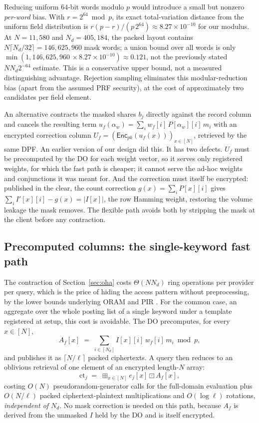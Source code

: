 \documentclass[a4paper,fleqn]{cas-sc}
\newif\ifauthorchecks
\newcommand{\authorcheck}[1]{\ifauthorchecks{\color{red}\textsf{[Authors: #1]}}\fi}
\newcommand{\Enc}{\mathsf{Enc}}
\newcommand{\bplus}{\boxplus}
\newcommand{\bdot}{\boxdot}
\begin{document}
Reducing uniform $64$-bit words modulo $p$ would introduce a
small but nonzero \emph{per-word} bias. With
$r=2^{64}\bmod p$, its exact total-variation distance from the uniform
field distribution is $r(p-r)/(p\,2^{64})\approx8.27\times10^{-10}$
for our modulus. At $N=11{,}580$ and $N_d=405{,}184$, the packed layout
contains $N\lceil N_d/32\rceil=146{,}625{,}960$ mask words;
a union bound over all words is only $\min(1,146{,}625{,}960\,
\times8.27\times10^{-10})\approx0.121$, not the previously stated
$N N_d 2^{-64}$ estimate. This is a conservative upper bound,
not a measured distinguishing advantage. Rejection sampling eliminates
this modular-reduction bias (apart from the assumed PRF security),
at the cost of approximately two candidates per field element. \authorcheck{The C++ prototype still reduces 64-bit
words; port the rejection sampler of the reference implementation
(crshe/prg.py) before re-running Section~\ref{sec:leakeval}.}

\begin{remark}
\label{rem:whyenc}
An alternative contracts the masked shares $b_j$ directly against the record
column and cancels the resulting term
$u_f(\alpha_w)=\sum_i w_f[i]\,P[\alpha_w][i]\,m_i$ with an encrypted correction
column $U_f=(\Enc_{pk}(u_f(x)))_{x\in[N]}$, retrieved by the same DPF. An
earlier version of our design did this. It has two defects. $U_f$ must be precomputed by
the DO for each weight vector, so it serves only registered weights, for which
the fast path is cheaper; it cannot serve the ad-hoc weights and conjunctions
it was meant for. And the correction must itself be encrypted: published in the
clear, the count correction $g(x)=\sum_iP[x][i]$ gives
$\sum_iI'[x][i]-g(x)=|I[x]|$, the row Hamming weight, restoring the volume
leakage the mask removes. The flexible path avoids both by stripping the mask
at the client before any contraction.
\end{remark}

\subsection{Precomputed columns: the single-keyword fast path}
\label{sec:fast}
The contraction of Section~\ref{sec:oha} costs $\Theta(N N_d)$ ring operations
per provider per query, which is the price of hiding the access pattern
without preprocessing, by the lower bounds underlying ORAM and PIR
\citep{goldreich1996software,beimel2000reducing}. For the common case, an
aggregate over the whole posting list of a single keyword under a template
registered at setup, this cost is avoidable. The DO precomputes, for every
$x\in[N]$,
\[
A_f[x] \;=\; \sum_{i\in[N_d]} I[x][i]\,w_f[i]\,m_i \bmod p ,
\]
and publishes it as $\lceil N/\ell\rceil$ packed ciphertexts. A query then
reduces to an oblivious retrieval of one element of an encrypted length-$N$
array:
\[
\text{ct}_j \;=\; \bplus_{x\in[N]} e_j[x]\bdot A_f[x],
\]
costing $O(N)$ pseudorandom-generator calls for the full-domain evaluation
plus $O(N/\ell)$ packed ciphertext-plaintext multiplications and
$O(\log \ell)$ rotations, \emph{independent of $N_d$}. No mask correction is
needed on this path, because $A_f$ is derived from the unmasked $I$ held by
the DO and is itself encrypted.
\end{document}
